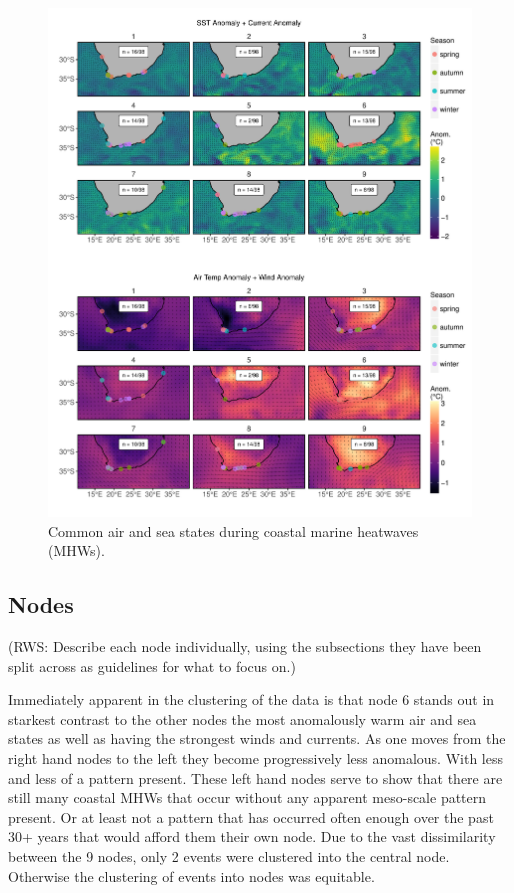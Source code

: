\documentclass[a4paper,10pt,review]{elsarticle}
\begin{document}
\begin{figure}
\includegraphics[width=1.0\textwidth]{figure_4.pdf}
\caption{Common air and sea states during coastal marine heatwaves (MHWs).}
\label{figure4}
\end{figure}

\subsection{Nodes}

(RWS: Describe each node individually, using the subsections they have been split across as guidelines for what to focus on.)

Immediately apparent in the clustering of the data is that node 6 stands out in starkest contrast to the other nodes the most anomalously warm air and sea states as well as having the strongest winds and currents. As one moves from the right hand nodes to the left they become progressively less anomalous. With less and less of a pattern present. These left hand nodes serve to show that there are still many coastal MHWs that occur without any apparent meso-scale pattern present. Or at least not a pattern that has occurred often enough over the past 30+ years that would afford them their own node. Due to the vast dissimilarity between the 9 nodes, only 2 events were clustered into the central node. Otherwise the clustering of events into nodes was equitable.
\end{document}
